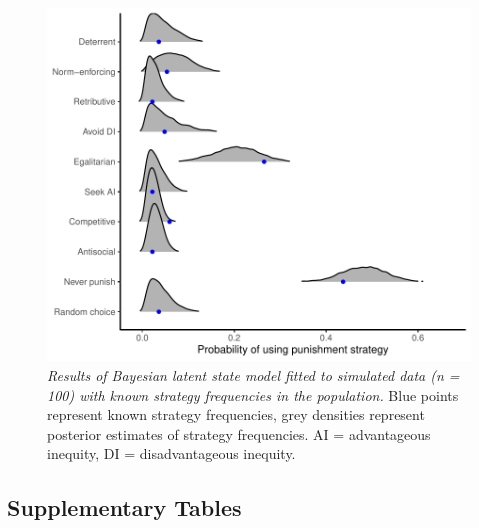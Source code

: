 \documentclass[
  english,
  man, donotrepeattitle,floatsintext]{apa6}
\begin{document}
\newpage







\begin{figure}
\centering
\includegraphics{manuscript_files/figure-latex/plotSim-1.pdf}
\caption{\label{fig:plotSim}\emph{Results of Bayesian latent state model fitted to simulated
data (n = 100) with known strategy frequencies in the population.} Blue points
represent known strategy frequencies, grey densities represent posterior
estimates of strategy frequencies. AI = advantageous inequity, DI =
disadvantageous inequity.}
\end{figure}

\newpage

\hypertarget{supplementary-tables}{%
\subsection{Supplementary Tables}\label{supplementary-tables}}
\end{document}
